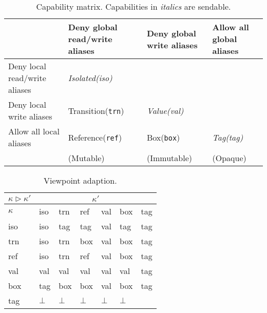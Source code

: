 \documentclass{article}
\begin{document}
\begin{table}[]
\begin{tabularx}{\textwidth}{|X|X|X|X|}
 \hline
 & Deny global read/write aliases & Deny global write aliases & Allow all global aliases \\  \hline
Deny local read/write aliases & \textit{Isolated(iso) }    &                           &                        \\  \hline
Deny local write aliases      & Transition(\texttt{trn})                & \textit{Value(val)  }              &                        \\  \hline
Allow all local aliases       & Reference(\texttt{ref})                 & Box(\texttt{box})                  & \textit{Tag(tag)  }             \\  \hline
                              & (Mutable)                      & (Immutable)               & (Opaque)   \\ \hline           
\end{tabularx}
\caption{Capability matrix. Capabilities in \textit{italics} are sendable.\cite{type-proof-paper} }
\end{table}

\begin{table}[]
\centering
\begin{tabular}{lllllll}
\hline
$\kappa \triangleright \kappa'$ & \multicolumn{6}{c}{$\kappa'$}             \\ \hline
$\kappa$                 & iso & trn & ref & val & box & tag \\ \hline \hline
iso               & iso & tag & tag & val & tag & tag \\ \hline
trn               & iso & trn & box & val & box & tag \\ \hline
ref               & iso & trn & ref & val & box & tag \\ \hline
val               & val & val & val & val & val & tag \\ \hline
box               & tag & box & box & val & box & tag \\ \hline
tag               &  $\bot$ & $\bot$ & $\bot$ & $\bot$ & $\bot$ &     \\ \hline
\end{tabular}
\caption{Viewpoint adaption.\cite{type-proof-paper}}
\end{table}
\end{document}
